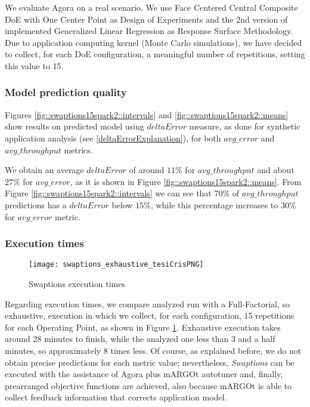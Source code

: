 We evaluate Agora on a real scenario. We use Face Centered Central Composite DoE with One Center Point as Design of Experiments and the 2nd version of implemented Generalized Linear Regression as Response Surface Methodology. Due to application computing kernel (Monte Carlo simulations), we have decided to collect, for each DoE configuration, a meaningful number of repetitions, setting this value to 15.


\subsubsection{Model prediction quality}

Figures \ref{fig::swaptions15spark2::intervals} and \ref{fig::swaptions15spark2::means} show results on predicted model using $deltaError$ measure, as done for synthetic application analysis (see \ref{deltaErrorExplanation}), for both $avg\_error$ and $avg\_throughput$ metrics.

We obtain an average $deltaError$ of around $11\%$ for $avg\_throughput$ and about $27\%$ for $avg\_error$, as it is shown in Figure \ref{fig::swaptions15spark2::means}. From Figure \ref{fig::swaptions15spark2::intervals} we can see that $70\%$ of $avg\_throughput$ predictions has a $deltaError$ below $15\%$, while this percentage increases to $30\%$ for $avg\_error$ metric.


\subsubsection{Execution times}

\begin{figure}[htb]

    \centering
    
    \texttt{[image: swaptions\_exhaustive\_tesiCrisPNG]}
    
    \caption{Swaptions execution times}
    
    \label{fig::sw::execT}
    
\end{figure}

Regarding execution times, we compare analyzed run with a Full-Factorial, so exhaustive, execution in which we collect, for each configuration, 15 repetitions for each Operating Point, as shown in Figure \ref{fig::sw::execT}. Exhaustive execution takes around 28 minutes to finish, while the analyzed one less than 3 and a half minutes, so approximately 8 times less. Of course, as explained before, we do not obtain precise predictions for each metric value; nevertheless, \textit{Swaptions} can be executed with the assistance of Agora plus mARGOt autotuner and, finally, prearranged objective functions are achieved, also because mARGOt is able to collect feedback information that corrects application model.


